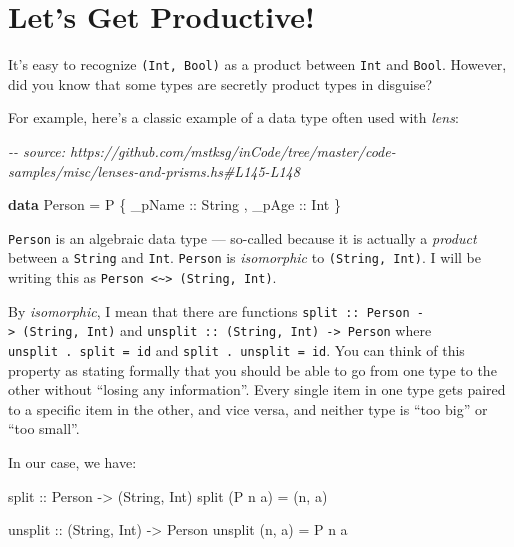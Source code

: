 \documentclass[]{article}
\newenvironment{Shaded}{}{}
\newcommand{\CommentTok}[1]{\textcolor[rgb]{0.38,0.63,0.69}{\textit{#1}}}
\newcommand{\DataTypeTok}[1]{\textcolor[rgb]{0.56,0.13,0.00}{#1}}
\newcommand{\KeywordTok}[1]{\textcolor[rgb]{0.00,0.44,0.13}{\textbf{#1}}}
\newcommand{\NormalTok}[1]{#1}
\newcommand{\OtherTok}[1]{\textcolor[rgb]{0.00,0.44,0.13}{#1}}
\begin{document}
\section{Let's Get Productive!}\label{lets-get-productive}

It's easy to recognize \texttt{(Int,\ Bool)} as a product between \texttt{Int}
and \texttt{Bool}. However, did you know that some types are secretly product
types in disguise?

For example, here's a classic example of a data type often used with
\emph{lens}:

\begin{Shaded}
\begin{Highlighting}[]
\CommentTok{{-}{-} source: https://github.com/mstksg/inCode/tree/master/code{-}samples/misc/lenses{-}and{-}prisms.hs\#L145{-}L148}

\KeywordTok{data} \DataTypeTok{Person} \OtherTok{=} \DataTypeTok{P}
\NormalTok{    \{}\OtherTok{ \_pName ::} \DataTypeTok{String}
\NormalTok{    ,}\OtherTok{ \_pAge  ::} \DataTypeTok{Int}
\NormalTok{    \}}
\end{Highlighting}
\end{Shaded}

\texttt{Person} is an algebraic data type --- so-called because it is actually a
\emph{product} between a \texttt{String} and \texttt{Int}. \texttt{Person} is
\emph{isomorphic} to \texttt{(String,\ Int)}. I will be writing this as
\texttt{Person\ \textless{}\textasciitilde{}\textgreater{}\ (String,\ Int)}.

By \emph{isomorphic}, I mean that there are functions
\texttt{split\ ::\ Person\ -\textgreater{}\ (String,\ Int)} and
\texttt{unsplit\ ::\ (String,\ Int)\ -\textgreater{}\ Person} where
\texttt{unsplit\ .\ split\ =\ id} and \texttt{split\ .\ unsplit\ =\ id}. You can
think of this property as stating formally that you should be able to go from
one type to the other without ``losing any information''. Every single item in
one type gets paired to a specific item in the other, and vice versa, and
neither type is ``too big'' or ``too small''.

In our case, we have:

\begin{Shaded}
\begin{Highlighting}[]
\OtherTok{split ::} \DataTypeTok{Person} \OtherTok{{-}\textgreater{}}\NormalTok{ (}\DataTypeTok{String}\NormalTok{, }\DataTypeTok{Int}\NormalTok{)}
\NormalTok{split (}\DataTypeTok{P}\NormalTok{ n a) }\OtherTok{=}\NormalTok{ (n, a)}

\OtherTok{unsplit ::}\NormalTok{ (}\DataTypeTok{String}\NormalTok{, }\DataTypeTok{Int}\NormalTok{) }\OtherTok{{-}\textgreater{}} \DataTypeTok{Person}
\NormalTok{unsplit (n, a) }\OtherTok{=} \DataTypeTok{P}\NormalTok{ n a}
\end{Highlighting}
\end{Shaded}
\end{document}
